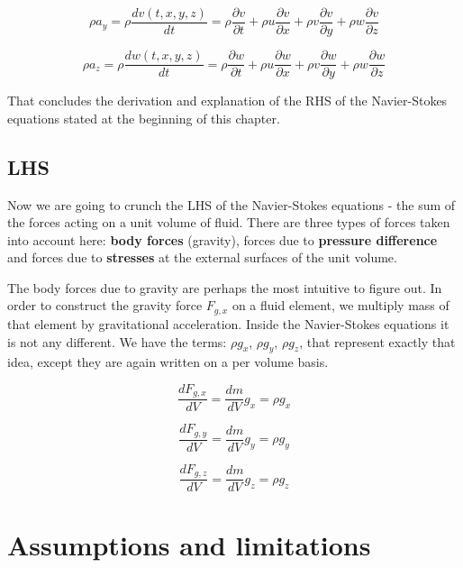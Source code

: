 \begin{equation}
\rho a_y = \rho \frac{d v(t,x,y,z)}{dt} = \rho \frac{\partial v}{\partial t} + \rho u \frac{\partial v}{\partial x} + \rho v \frac{\partial v}{\partial y} + \rho w \frac{\partial v}{\partial z}
\end{equation}

\begin{equation}
\rho a_z = \rho \frac{d w(t,x,y,z)}{dt} = \rho \frac{\partial w}{\partial t} + \rho u \frac{\partial w}{\partial x} + \rho v \frac{\partial w}{\partial y} + \rho w \frac{\partial w}{\partial z}
\end{equation}

That concludes the derivation and explanation of the RHS of the Navier-Stokes equations stated at the beginning of this chapter.


\subsection{LHS}

Now we are going to crunch the LHS of the Navier-Stokes equations - the sum of the forces acting on a unit volume of fluid. There are three types of forces taken into account here: \textbf{body forces} (gravity), forces due to \textbf{pressure difference} and forces due to \textbf{stresses} at the external surfaces of the unit volume.

The body forces due to gravity are perhaps the most intuitive to figure out. In order to construct the gravity force $F_{g, x}$ on a fluid element, we multiply mass of that element by gravitational acceleration. Inside the Navier-Stokes equations it is not any different. We have the terms: $\rho g_x$, $\rho g_y$, $\rho g_z$, that represent exactly that idea, except they are again written on a per volume basis.

\begin{equation}
\frac{d F_{g, x}}{dV} = \frac{dm}{dV} g_x =  \rho g_x
\end{equation}

\begin{equation}
\frac{d F_{g, y}}{dV} = \frac{dm}{dV} g_y =  \rho g_y
\end{equation}

\begin{equation}
\frac{d F_{g, z}}{dV} = \frac{dm}{dV} g_z =  \rho g_z
\end{equation}

\section{Assumptions and limitations}





